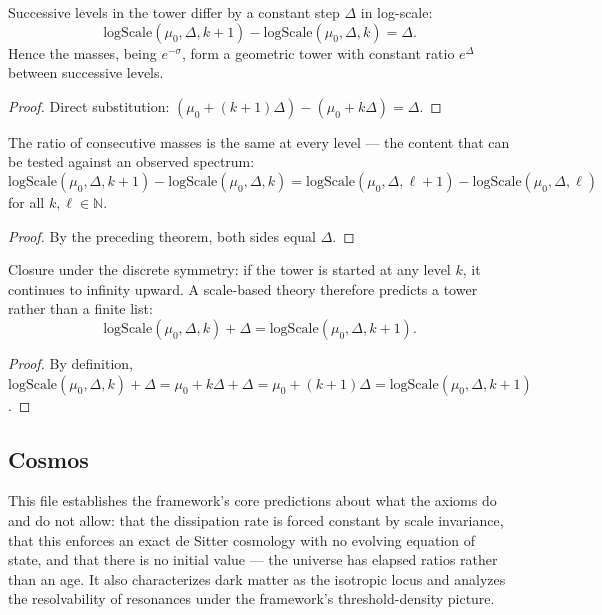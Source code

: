\begin{theorem}
Successive levels in the tower differ by a constant step $\Delta$ in log-scale:
\begin{equation}
\text{logScale}(\mu_0, \Delta, k+1) - \text{logScale}(\mu_0, \Delta, k) = \Delta.
\end{equation}
Hence the masses, being $e^{-\sigma}$, form a geometric tower with constant ratio $e^\Delta$ between successive levels.
\begin{proof}
Direct substitution: $(\mu_0 + (k+1)\Delta) - (\mu_0 + k\Delta) = \Delta$.
\end{proof}
\end{theorem}

\begin{theorem}
The ratio of consecutive masses is the same at every level — the content that can be tested against an observed spectrum:
\begin{equation}
\text{logScale}(\mu_0, \Delta, k+1) - \text{logScale}(\mu_0, \Delta, k) = \text{logScale}(\mu_0, \Delta, \ell+1) - \text{logScale}(\mu_0, \Delta, \ell)
\end{equation}
for all $k, \ell \in \mathbb{N}$.
\begin{proof}
By the preceding theorem, both sides equal $\Delta$.
\end{proof}
\end{theorem}

\begin{theorem}
Closure under the discrete symmetry: if the tower is started at any level $k$, it continues to infinity upward. A scale-based theory therefore predicts a tower rather than a finite list:
\begin{equation}
\text{logScale}(\mu_0, \Delta, k) + \Delta = \text{logScale}(\mu_0, \Delta, k+1).
\end{equation}
\begin{proof}
By definition, $\text{logScale}(\mu_0, \Delta, k) + \Delta = \mu_0 + k\Delta + \Delta = \mu_0 + (k+1)\Delta = \text{logScale}(\mu_0, \Delta, k+1)$.
\end{proof}
\end{theorem}

\subsection{Cosmos}

This file establishes the framework's core predictions about what the axioms do and do not allow: that the dissipation rate is forced constant by scale invariance, that this enforces an exact de Sitter cosmology with no evolving equation of state, and that there is no initial value — the universe has elapsed ratios rather than an age. It also characterizes dark matter as the isotropic locus and analyzes the resolvability of resonances under the framework's threshold-density picture.

